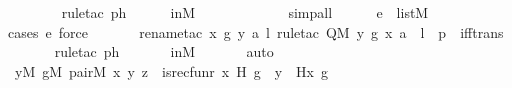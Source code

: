 \begin{isabellebody}
\ \ \ \ \ \ \isamarkupfalse%
\ {\isacharparenleft}{\kern0pt}rule{\isacharunderscore}{\kern0pt}tac\ ph{\isacharparenright}{\kern0pt}\isanewline
\ \ \ \ \isamarkupfalse%
\ inM\ \isanewline
\ \ \ \ \ \ \ \ \ \ \isamarkupfalse%
\ {\isacharparenleft}{\kern0pt}simp{\isacharunderscore}{\kern0pt}all{\isacharparenright}{\kern0pt}\isanewline
\ \ \ \ \isamarkupfalse%
\ {\isacartoucheopen}e\ {\isasymin}\ list{\isacharparenleft}{\kern0pt}M{\isacharparenright}{\kern0pt}{\isacartoucheclose}\isanewline
\ \ \ \ \isamarkupfalse%
{\isacharparenleft}{\kern0pt}cases\ e{\isacharcomma}{\kern0pt}\ force{\isacharparenright}{\kern0pt}\isanewline
\ \ \ \ \ \isamarkupfalse%
\ {\isacharparenleft}{\kern0pt}rename{\isacharunderscore}{\kern0pt}tac\ x{\isacharprime}{\kern0pt}\ g\ y\ a\ l{\isacharcomma}{\kern0pt}\ rule{\isacharunderscore}{\kern0pt}tac\ Q{\isacharequal}{\kern0pt}{\isachardoublequoteopen}M{\isacharcomma}{\kern0pt}\ {\isacharbrackleft}{\kern0pt}y{\isacharcomma}{\kern0pt}\ g{\isacharcomma}{\kern0pt}\ x{\isacharprime}{\kern0pt}{\isacharcomma}{\kern0pt}\ a{\isacharbrackright}{\kern0pt}\ {\isacharat}{\kern0pt}\ l\ {\isasymTurnstile}\ p{\isachardoublequoteclose}\ \ iff{\isacharunderscore}{\kern0pt}trans{\isacharparenright}{\kern0pt}\isanewline
\ \ \ \ \ \isamarkupfalse%
\ {\isacharparenleft}{\kern0pt}rule{\isacharunderscore}{\kern0pt}tac\ ph{\isacharparenright}{\kern0pt}\ \isanewline
\ \ \ \ \isamarkupfalse%
\ inM\ \isanewline
\ \ \ \ \isamarkupfalse%
\ auto\ \ \ \ \isanewline
\ \ \isamarkupfalse%
\ {\isachardoublequoteopen}{\isacharparenleft}{\kern0pt}{\isasymexists}y{\isacharbrackleft}{\kern0pt}{\isacharhash}{\kern0pt}{\isacharhash}{\kern0pt}M{\isacharbrackright}{\kern0pt}{\isachardot}{\kern0pt}\ {\isasymexists}g{\isacharbrackleft}{\kern0pt}{\isacharhash}{\kern0pt}{\isacharhash}{\kern0pt}M{\isacharbrackright}{\kern0pt}{\isachardot}{\kern0pt}\ pair{\isacharparenleft}{\kern0pt}{\isacharhash}{\kern0pt}{\isacharhash}{\kern0pt}M{\isacharcomma}{\kern0pt}\ x{\isacharcomma}{\kern0pt}\ y{\isacharcomma}{\kern0pt}\ z{\isacharparenright}{\kern0pt}\ {\isasymand}\ is{\isacharunderscore}{\kern0pt}recfun{\isacharparenleft}{\kern0pt}r{\isacharcomma}{\kern0pt}\ x{\isacharcomma}{\kern0pt}\ H{\isacharcomma}{\kern0pt}\ g{\isacharparenright}{\kern0pt}\ {\isasymand}\ y\ {\isacharequal}{\kern0pt}\ H{\isacharparenleft}{\kern0pt}x{\isacharcomma}{\kern0pt}\ g{\isacharparenright}{\kern0pt}{\isacharparenright}{\kern0pt}\isanewline

\end{isabellebody}
